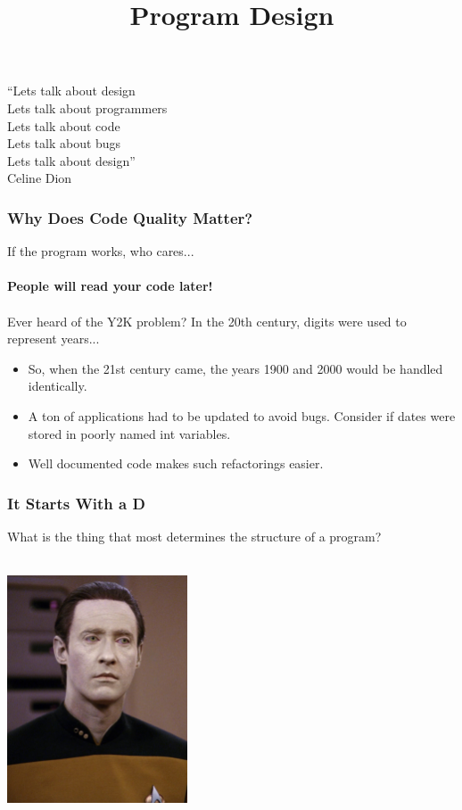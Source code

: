 \documentclass{beamer}
\title{Program Design}
\begin{document}
\begin{frame}
\titlepage
\end{frame}

\begin{frame}
  ``Lets talk about design\\
  Lets talk about programmers\\
  Lets talk about code\\
  Lets talk about bugs\\
  Lets talk about design''\\
  Celine Dion
\end{frame}

\begin{frame}
  \frametitle{Why Does Code Quality Matter?}
  \large If the program works, who cares...\\\\
  \pause
  \huge \textbf{People will read your code later!}\\\\
  \pause
  \large Ever heard of the Y2K problem? In the 20th century, digits were used to represent years...
  \begin{itemize}
  \item<4->  So, when the 21st century came, the years 1900 and 2000 would be handled identically.
  \item<5-> A ton of applications had to be updated to avoid bugs. Consider if dates were stored in poorly named int variables.
  \item<6-> Well documented code makes such refactorings easier.
  \end{itemize}
\end{frame}

\begin{frame}
  \frametitle{It Starts With a D}
  \large What is the thing that most determines the structure of a program?\\\\
  \pause
  \begin{center}
    \includegraphics[width=0.4\textwidth]{images/data.jpg}
  \end{center}
\end{frame}
\end{document}
